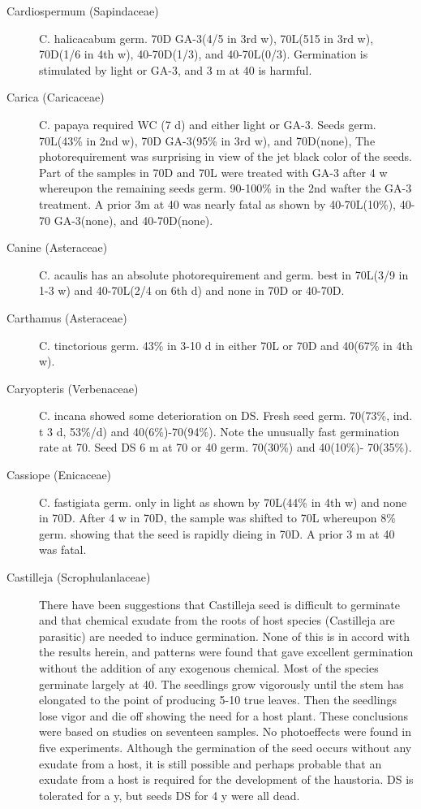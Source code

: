 \begin{description}
\item[Cardiospermum (Sapindaceae)] C. halicacabum germ. 70D GA-3(4/5 in
3rd w), 70L(515 in 3rd w), 70D(1/6 in 4th w), 40-70D(1/3), and 40-70L(0/3).
Germination is stimulated by light or GA-3, and 3 m at 40 is harmful.
\item[Carica (Caricaceae)] C. papaya required WC (7 d) and either light or GA-3.
Seeds germ. 70L(43\% in 2nd w), 70D GA-3(95\% in 3rd w), and 70D(none), The
photorequirement was surprising in view of the jet black color of the seeds. Part of the
samples in 70D and 70L were treated with GA-3 after 4 w whereupon the remaining
seeds germ. 90-100\% in the 2nd wafter the GA-3 treatment. A prior 3m at 40 was
nearly fatal as shown by 40-70L(10\%), 40-70 GA-3(none), and 40-70D(none).
\item[Canine (Asteraceae)] C. acaulis has an absolute photorequirement and
germ. best in 70L(3/9 in 1-3 w) and 40-70L(2/4 on 6th d) and none in 70D or 40-70D.
\item[Carthamus (Asteraceae)] C. tinctorious germ. 43\% in 3-10 d in either 70L
or 70D and 40(67\% in 4th w).
\item[Caryopteris (Verbenaceae)] C. incana showed some deterioration on DS.
Fresh seed germ. 70(73\%, ind. t 3 d, 53\%/d) and 40(6\%)-70(94\%). Note the unusually
fast germination rate at 70. Seed DS 6 m at 70 or 40 germ. 70(30\%) and 40(10\%)-
70(35\%).
\item[Cassiope (Enicaceae)] C. fastigiata germ. only in light as shown by
70L(44\% in 4th w) and none in 70D. After 4 w in 70D, the sample was shifted to 70L
whereupon 8\% germ. showing that the seed is rapidly dieing in 70D. A prior 3 m at 40
was fatal.

\item[Castilleja (Scrophulanlaceae)] There have been suggestions that
Castilleja seed is difficult to germinate and that chemical exudate from the roots of host
species (Castilleja are parasitic) are needed to induce germination. None of this is in
accord with the results herein, and patterns were found that gave excellent
germination without the addition of any exogenous chemical. Most of the species
germinate largely at 40. The seedlings grow vigorously until the stem has elongated
to the point of producing 5-10 true leaves. Then the seedlings lose vigor and die off
showing the need for a host plant. These conclusions were based on studies on
seventeen samples. No photoeffects were found in five experiments. Although the
germination of the seed occurs without any exudate from a host, it is still possible and
perhaps probable that an exudate from a host is required for the development of the
haustoria. DS is tolerated for a y, but seeds DS for 4 y were all dead.


\end{description}
